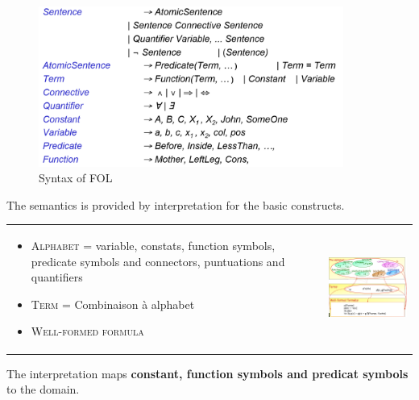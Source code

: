 	\begin{figure}[h]
		\centering
		\includegraphics[width=10cm]{fol_bnf.png}
		\caption{Syntax of FOL}
	\end{figure}

 The semantics is  provided by interpretation for  the basic constructs.

 \begin{tabular}{m{7cm}m{1cm}m{6cm}}
     \begin{itemize}
         \item \textsc{Alphabet} = variable, constats, function symbols, predicate symbols and 
             connectors, puntuations and quantifiers
         \item \textsc{Term} = Combinaison à alphabet
         \item \textsc{Well-formed formula}
     \end{itemize}
     &&
     \includegraphics[width=6cm]{fol.png}
 \end{tabular}


 The interpretation maps \textbf{constant, function symbols and predicat symbols}
 to the domain.

